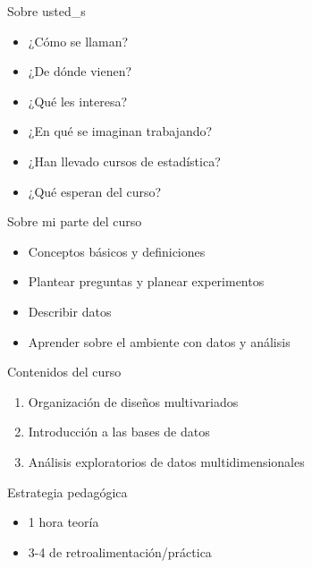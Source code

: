 \documentclass[
  11pt,
  ignorenonframetext,
]{beamer}
\providecommand{\tightlist}{%
  \setlength{\itemsep}{0pt}\setlength{\parskip}{0pt}}
\begin{document}
\begin{frame}{Sobre usted\_s}
\protect\hypertarget{sobre-usted_s}{}
\begin{itemize}
\tightlist
\item
  ¿Cómo se llaman?
\item
  ¿De dónde vienen?
\item
  ¿Qué les interesa?
\item
  ¿En qué se imaginan trabajando?
\item
  ¿Han llevado cursos de estadística?
\item
  ¿Qué esperan del curso?
\end{itemize}
\end{frame}

\begin{frame}{Sobre mi parte del curso}
\protect\hypertarget{sobre-mi-parte-del-curso}{}
\begin{itemize}
\tightlist
\item
  Conceptos básicos y definiciones
\item
  Plantear preguntas y planear experimentos
\item
  Describir datos
\item
  Aprender sobre el ambiente con datos y análisis
\end{itemize}
\end{frame}

\begin{frame}{Contenidos del curso}
\protect\hypertarget{contenidos-del-curso}{}
\begin{enumerate}
\item
  Organización de diseños multivariados
\item
  Introducción a las bases de datos
\item
  Análisis exploratorios de datos multidimensionales
\end{enumerate}
\end{frame}

\begin{frame}{Estrategia pedagógica}
\protect\hypertarget{estrategia-pedaguxf3gica}{}
\begin{itemize}
\item
  1 hora teoría
\item
  3-4 de retroalimentación/práctica
\end{itemize}
\end{frame}
\end{document}

